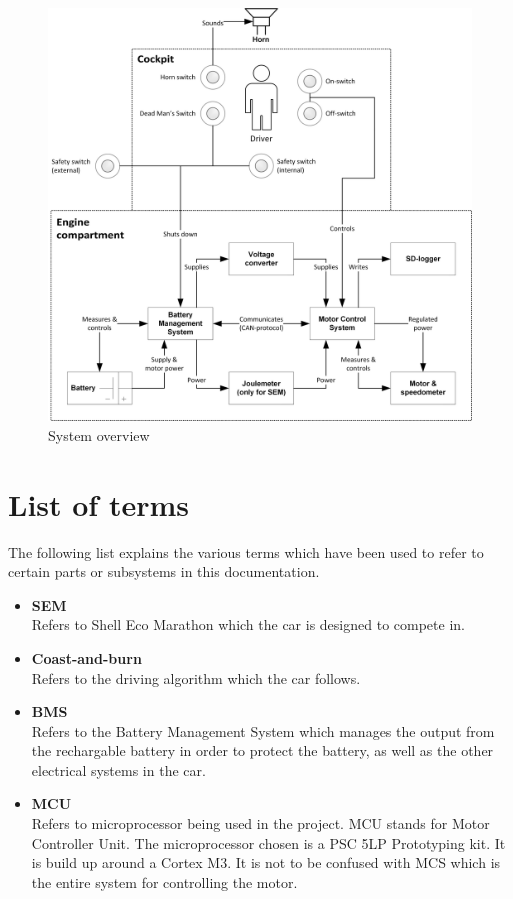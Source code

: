 \begin{figure}[H]
	\centering
	\includegraphics[width=1\linewidth]{Introduction/Overview}
	\caption{System overview}
	\label{fig:System_overview}
\end{figure}

\section{List of terms}
The following list explains the various terms which have been used to refer to certain parts or subsystems in this documentation.

\begin{itemize}
	\item \textbf{SEM}\\
	Refers to Shell Eco Marathon which the car is designed to compete in.
	\item \textbf{Coast-and-burn}\\
	Refers to the driving algorithm which the car follows.
	\item \textbf{BMS}\\
	Refers to the Battery Management System which manages the output from the rechargable battery in order to protect the battery, as well as the other electrical systems in the car.
	\item \textbf{MCU}\\
	Refers to microprocessor being used in the project. MCU stands for Motor Controller Unit. The microprocessor chosen is a PSC 5LP Prototyping kit. It is build up around a Cortex M3. It is not to be confused with MCS which is the entire system for controlling the motor. 
\end{itemize}